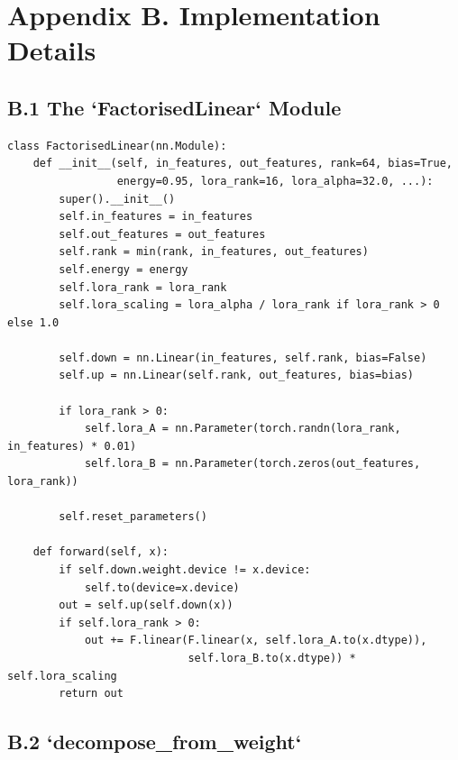 
\section{Appendix B. Implementation Details}

\subsection{B.1 The `FactorisedLinear` Module}

\begin{lstlisting}
class FactorisedLinear(nn.Module):
    def __init__(self, in_features, out_features, rank=64, bias=True,
                 energy=0.95, lora_rank=16, lora_alpha=32.0, ...):
        super().__init__()
        self.in_features = in_features
        self.out_features = out_features
        self.rank = min(rank, in_features, out_features)
        self.energy = energy
        self.lora_rank = lora_rank
        self.lora_scaling = lora_alpha / lora_rank if lora_rank > 0 else 1.0
        
        self.down = nn.Linear(in_features, self.rank, bias=False)
        self.up = nn.Linear(self.rank, out_features, bias=bias)
        
        if lora_rank > 0:
            self.lora_A = nn.Parameter(torch.randn(lora_rank, in_features) * 0.01)
            self.lora_B = nn.Parameter(torch.zeros(out_features, lora_rank))
        
        self.reset_parameters()
    
    def forward(self, x):
        if self.down.weight.device != x.device:
            self.to(device=x.device)
        out = self.up(self.down(x))
        if self.lora_rank > 0:
            out += F.linear(F.linear(x, self.lora_A.to(x.dtype)), 
                            self.lora_B.to(x.dtype)) * self.lora_scaling
        return out
\end{lstlisting}

\subsection{B.2 `decompose\_from\_weight`}

